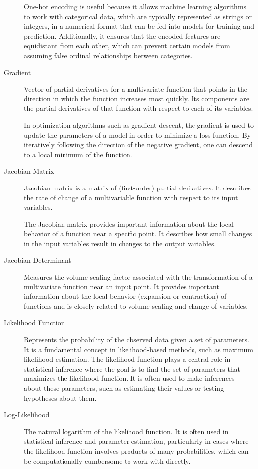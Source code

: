 \documentclass[a4paper]{article}
\begin{document}
\begin{description}
One-hot encoding is useful because it allows machine learning algorithms to work with categorical data, which are typically represented as strings or integers, in a numerical format that can be fed into models for training and prediction. Additionally, it ensures that the encoded features are equidistant from each other, which can prevent certain models from assuming false ordinal relationships between categories.

\item[Gradient]
Vector of partial derivatives for a multivariate function that points in the direction in which the function increases most quickly. Its components are the partial derivatives of that function with respect to each of its variables.

In optimization algorithms such as gradient descent, the gradient is used to update the parameters of a model in order to minimize a loss function. By iteratively following the direction of the negative gradient, one can descend to a local minimum of the function.

\item[Jacobian Matrix]
Jacobian matrix is a matrix of (first-order) partial derivatives. It describes the rate of change of a multivariable function with respect to its input variables. 

The Jacobian matrix provides important information about the local behavior of a function near a specific point. It describes how small changes in the input variables result in changes to the output variables.

\item[Jacobian Determinant]
Measures the volume scaling factor associated with the transformation of a multivariate function near an input point. It provides important information about the local behavior (expansion or contraction) of functions and is closely related to volume scaling and change of variables.

\item[Likelihood Function]
Represents the probability of the observed data given a set of parameters. It is a fundamental concept in likelihood-based methods, such as maximum likelihood estimation. The likelihood function plays a central role in statistical inference where the goal is to find the set of parameters that maximizes the likelihood function. It is often used to make inferences about these parameters, such as estimating their values or testing hypotheses about them.

\item[Log-Likelihood]
The natural logarithm of the likelihood function. It is often used in statistical inference and parameter estimation, particularly in cases where the likelihood function involves products of many probabilities, which can be computationally cumbersome to work with directly.


\end{description}
\end{document}
